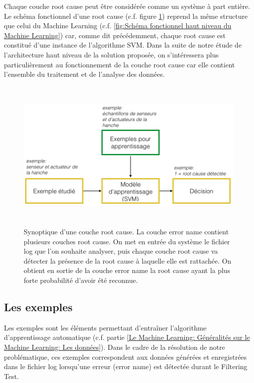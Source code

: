 Chaque couche root cause peut être considérée comme un système à part entière. Le schéma fonctionnel d'une root cause (c.f. figure 	\ref{fig:Synoptique d'une couche root cause}) reprend la même structure que celui du Machine Learning (c.f. \ref{fig:Schéma fonctionnel haut niveau du Machine Learning}) car, comme dit précédemment, chaque root cause est constitué d'une instance de l'algorithme SVM. Dans la suite de notre étude de l'architecture haut niveau de la solution proposée, on s'intéressera plus particulièrement  au fonctionnement de la couche root cause car elle contient l'ensemble du traitement et de l'analyse des données.

\begin{figure}[h]
	\centering\includegraphics[height=7.4cm]{images/exemple_root.png}
	\caption[Synoptique d'une couche root cause]{Synoptique d'une couche root cause. La couche error name contient plusieurs couches root cause. On met en entrée du système le fichier log que l'on souhaite analyser, puis chaque couche root cause va détecter la présence de la root cause à laquelle elle est rattachée. On obtient en sortie de la couche error name la root cause  ayant la plus forte probabilité d'avoir été reconnue.}
	\label{fig:Synoptique d'une couche root cause}
\end{figure}

\subsection{Les exemples}
\label{Automatisation du processus d'investigation: Achitecture High Level du système proposé: Les exemples}
Les exemples sont les éléments permettant d'entraîner l'algorithme d'apprentissage automatique (c.f. partie \ref{Le Machine Learning: Généralités sur le Machine Learning: Les données}). Dans le cadre de la résolution de notre problématique, ces exemples correspondent aux données générées et enregistrées dans le fichier log lorsqu'une erreur (error name) est détectée durant le Filtering Test.

